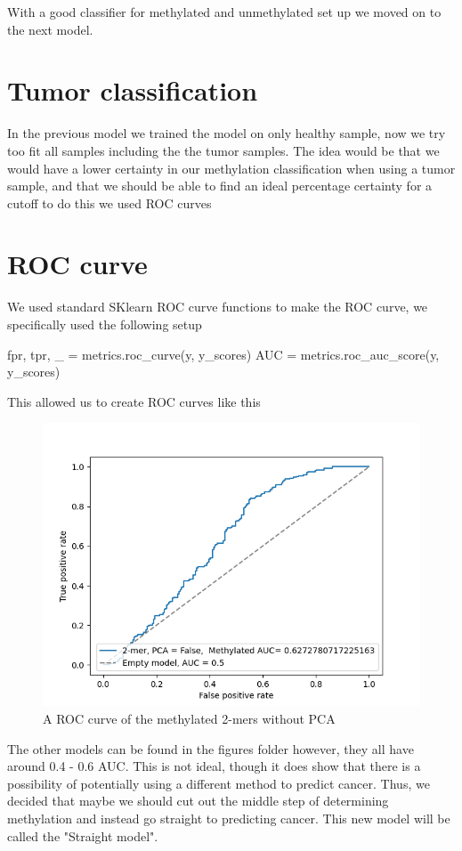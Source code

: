 With a good classifier for methylated and unmethylated set up we moved on to the next model.
\section{Tumor classification}
In the previous model we trained the model on only healthy sample, now we try too fit all samples including the the tumor samples. The idea would be that we would have a lower certainty in our methylation classification when using a tumor sample, and that we should be able to find an ideal percentage certainty for a cutoff to do this we used ROC curves
\section{ROC curve}
We used standard SKlearn ROC curve functions to make the ROC curve, we specifically used the following setup
\begin{python}
fpr, tpr, _ = metrics.roc_curve(y, y_scores)
AUC = metrics.roc_auc_score(y, y_scores)
\end{python}
This allowed us to create ROC curves like this
\begin{figure}[H]
	\centering
	\includegraphics[width=0.7\linewidth]{../../figures/methylation_model/ROC/2-mer, PCA = False Methylated.png}
	\caption{A ROC curve of the methylated 2-mers without PCA}
	\label{fig:allhealthy2}
\end{figure}
The other models can be found in the figures folder however, they all have around 0.4 - 0.6 AUC. This is not ideal, though it does show that there is a possibility of potentially using a different method to predict cancer.
Thus, we decided that maybe we should cut out the middle step of determining methylation and instead go straight to predicting cancer. This new model will be called the "Straight model".
\newpage
